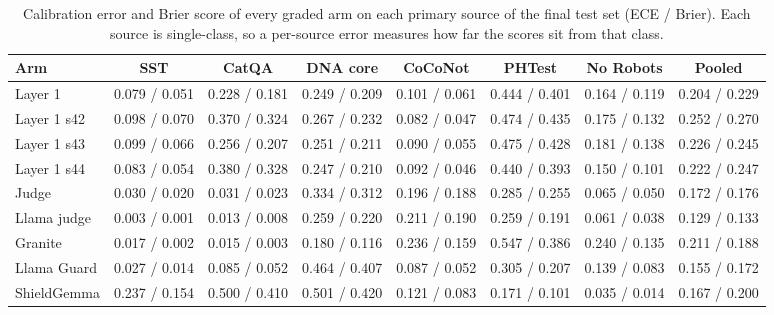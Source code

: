 \documentclass[journal]{IEEEtran}
\begin{document}
\setcounter{table}{13}
\begin{table}[!htbp]
\caption{Calibration error and Brier score of every graded arm on each primary source of the final test set (ECE / Brier). Each source is single-class, so a per-source error measures how far the scores sit from that class.}
\label{abr:tab:persource}
\centering
\scriptsize
\setlength{\tabcolsep}{3pt}
\begin{tabular}{@{}lccccccc@{}}
\toprule
Arm & SST & CatQA & DNA core & CoCoNot & PHTest & No Robots & Pooled \\
\midrule
Layer 1 & 0.079 / 0.051 & 0.228 / 0.181 & 0.249 / 0.209 & 0.101 / 0.061 & 0.444 / 0.401 & 0.164 / 0.119 & 0.204 / 0.229 \\
Layer 1 s42 & 0.098 / 0.070 & 0.370 / 0.324 & 0.267 / 0.232 & 0.082 / 0.047 & 0.474 / 0.435 & 0.175 / 0.132 & 0.252 / 0.270 \\
Layer 1 s43 & 0.099 / 0.066 & 0.256 / 0.207 & 0.251 / 0.211 & 0.090 / 0.055 & 0.475 / 0.428 & 0.181 / 0.138 & 0.226 / 0.245 \\
Layer 1 s44 & 0.083 / 0.054 & 0.380 / 0.328 & 0.247 / 0.210 & 0.092 / 0.046 & 0.440 / 0.393 & 0.150 / 0.101 & 0.222 / 0.247 \\
Judge & 0.030 / 0.020 & 0.031 / 0.023 & 0.334 / 0.312 & 0.196 / 0.188 & 0.285 / 0.255 & 0.065 / 0.050 & 0.172 / 0.176 \\
Llama judge & 0.003 / 0.001 & 0.013 / 0.008 & 0.259 / 0.220 & 0.211 / 0.190 & 0.259 / 0.191 & 0.061 / 0.038 & 0.129 / 0.133 \\
Granite & 0.017 / 0.002 & 0.015 / 0.003 & 0.180 / 0.116 & 0.236 / 0.159 & 0.547 / 0.386 & 0.240 / 0.135 & 0.211 / 0.188 \\
Llama Guard & 0.027 / 0.014 & 0.085 / 0.052 & 0.464 / 0.407 & 0.087 / 0.052 & 0.305 / 0.207 & 0.139 / 0.083 & 0.155 / 0.172 \\
ShieldGemma & 0.237 / 0.154 & 0.500 / 0.410 & 0.501 / 0.420 & 0.121 / 0.083 & 0.171 / 0.101 & 0.035 / 0.014 & 0.167 / 0.200 \\
\bottomrule
\end{tabular}
\end{table}
\end{document}
